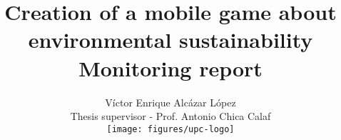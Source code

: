 

\title{Creation of a mobile game about environmental sustainability \\
 \large Monitoring report}

\author{Víctor Enrique Alcázar López \\
	Thesis supervisor - Prof. Antonio Chica Calaf \\
	\texttt{[image: figures/upc-logo]}
}


\maketitle
\tableofcontents














